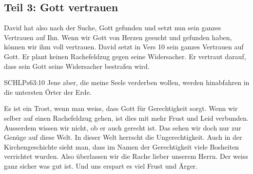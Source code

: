 \documentclass[14pt]{mybib}
\begin{document}
    \subsection*{Teil 3: Gott vertrauen}
    \begin{otsblock}
    David hat also nach der Suche, Gott gefunden und setzt nun sein ganzes Vertrauen auf Ihn.
    Wenn wir Gott von Herzen gesucht und gefunden haben, können wir ihm voll vertrauen. David setzt in Vers 10 sein ganzes Vertrauen auf Gott. Er plant keinen Rachefeldzug gegen seine Widersacher. Er vertraut darauf, dass sein Gott seine Widersacher bestrafen wird.
    \begin{bibelbox}{SCHL}{Ps}{63:10}
        Jene aber, die meine Seele verderben wollen, werden hinabfahren in die untersten Örter der Erde.
    \end{bibelbox}
    Es ist ein Trost, wenn man weiss, dass Gott für Gerechtigkeit sorgt. Wenn wir selber auf einen Rachefeldzug gehen, ist dies mit  mehr Frust und Leid verbunden. Ausserdem wissen wir nicht, ob er auch gerecht ist. Das sehen wir doch nur zur Genüge auf diese Welt. In dieser Welt herrscht die Ungerechtigkeit. Auch in der Kirchengeschichte sieht man, dass im Namen der Gerechtigkeit viele Bosheiten verrichtet wurden. Also überlassen wir die Rache lieber unserem Herrn. Der weiss ganz sicher was gut ist. Und uns erspart es viel Frust und Ärger. 
    \end{otsblock}
\end{document}

